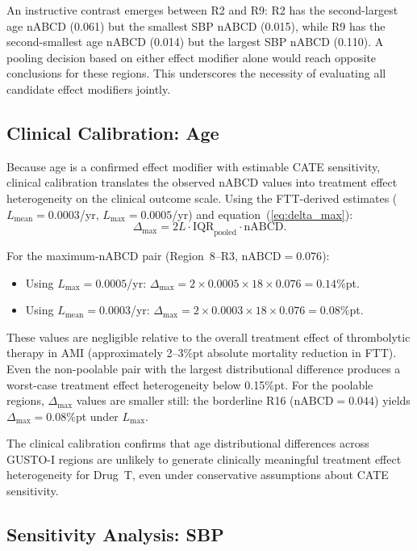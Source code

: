 An instructive contrast emerges between R2 and R9: R2 has the second-largest age nABCD (0.061) but the smallest SBP nABCD (0.015), while R9 has the second-smallest age nABCD (0.014) but the largest SBP nABCD (0.110). A pooling decision based on either effect modifier alone would reach opposite conclusions for these regions. This underscores the necessity of evaluating all candidate effect modifiers jointly.

\subsection{Clinical Calibration: Age}\label{sec:app_age}

Because age is a confirmed effect modifier with estimable CATE sensitivity, clinical calibration translates the observed nABCD values into treatment effect heterogeneity on the clinical outcome scale. Using the FTT-derived estimates ($L_{\text{mean}} = 0.0003$/yr, $L_{\max} = 0.0005$/yr) and equation~(\ref{eq:delta_max}):
\[
\Delta_{\max} = 2L \cdot \text{IQR}_{\text{pooled}} \cdot \text{nABCD}.
\]

For the maximum-nABCD pair (Region~8--R3, $\text{nABCD} = 0.076$):
\begin{itemize}
  \item Using $L_{\max} = 0.0005$/yr: $\Delta_{\max} = 2 \times 0.0005 \times 18 \times 0.076 = 0.14$\%pt.
  \item Using $L_{\text{mean}} = 0.0003$/yr: $\Delta_{\max} = 2 \times 0.0003 \times 18 \times 0.076 = 0.08$\%pt.
\end{itemize}
These values are negligible relative to the overall treatment effect of thrombolytic therapy in AMI (approximately 2--3\%pt absolute mortality reduction in FTT). Even the non-poolable pair with the largest distributional difference produces a worst-case treatment effect heterogeneity below 0.15\%pt. For the poolable regions, $\Delta_{\max}$ values are smaller still: the borderline R16 ($\text{nABCD} = 0.044$) yields $\Delta_{\max} = 0.08$\%pt under $L_{\max}$.

The clinical calibration confirms that age distributional differences across GUSTO-I regions are unlikely to generate clinically meaningful treatment effect heterogeneity for Drug~T, even under conservative assumptions about CATE sensitivity.

\subsection{Sensitivity Analysis: SBP}\label{sec:app_sbp}


